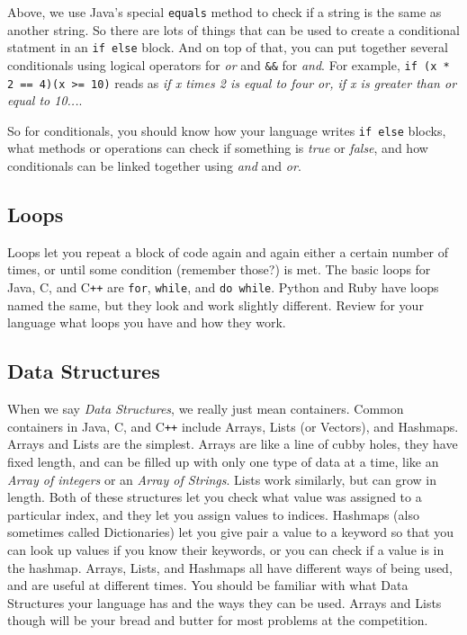 \documentclass[a4paper]{article}
\begin{document}
Above, we use Java's special \texttt{equals} method to check if a string is the same as another string. So there are lots of things that can be used to create a conditional statment in an \texttt{if else} block. And on top of that, you can put together several conditionals using logical operators \texttt{\textbar\textbar} for \textit{or} and \texttt{\&\&} for \textit{and}. For example, \texttt{if (x * 2 == 4)\textbar\textbar (x >= 10)} reads as \textit{if x times 2 is equal to four or, if x is greater than or equal to 10...}. 

So for conditionals, you should know how your language writes \texttt{if else} blocks, what methods or operations can check if something is \textit{true} or \textit{false}, and how conditionals can be linked together using \textit{and} and \textit{or}.

\subsection{Loops}
Loops let you repeat a block of code again and again either a certain number of times, or until some condition (remember those?) is met. The basic loops for Java, C, and C\texttt{++} are \texttt{for}, \texttt{while}, and \texttt{do while}. Python and Ruby have loops named the same, but they look and work slightly different. Review for your language what loops you have and how they work.

\subsection{Data Structures}
When we say \textit{Data Structures}, we really just mean containers. Common containers in Java, C, and C\texttt{++} include Arrays, Lists (or Vectors), and Hashmaps. Arrays and Lists are the simplest. Arrays are like a line of cubby holes, they have fixed length, and can be filled up with only one type of data at a time, like an \textit{Array of integers} or an \textit{Array of Strings}. Lists work similarly, but can grow in length. Both of these structures let you check what value was assigned to a particular index, and they let you assign values to indices. Hashmaps (also sometimes called Dictionaries) let you give pair a value to a keyword so that you can look up values if you know their keywords, or you can check if a value is in the hashmap. Arrays, Lists, and Hashmaps all have different ways of being used, and are useful at different times. You should be familiar with what Data Structures your language has and the ways they can be used. Arrays and Lists though will be your bread and butter for most problems at the competition.
\end{document}
